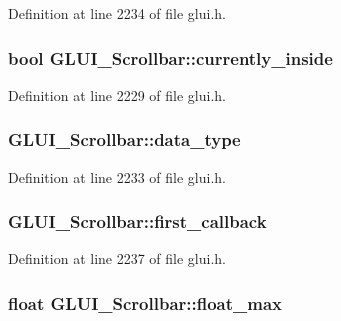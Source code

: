Definition at line 2234 of file glui.\+h.

\hypertarget{class_g_l_u_i___scrollbar_a143ab721307bb6333c74cad18ac7d07d}{
\subsubsection[{currently\+\_\+inside}]{\setlength{\rightskip}{0pt plus 5cm}bool G\+L\+U\+I\+\_\+\+Scrollbar\+::currently\+\_\+inside}}\label{class_g_l_u_i___scrollbar_a143ab721307bb6333c74cad18ac7d07d}


Definition at line 2229 of file glui.\+h.

\hypertarget{class_g_l_u_i___scrollbar_ab541530d2e7482a4bd3b35f938a5d3ae}{
\subsubsection[{data\+\_\+type}]{ G\+L\+U\+I\+\_\+\+Scrollbar\+::data\+\_\+type}}\label{class_g_l_u_i___scrollbar_ab541530d2e7482a4bd3b35f938a5d3ae}


Definition at line 2233 of file glui.\+h.

\hypertarget{class_g_l_u_i___scrollbar_afef0631b46631c19c611d2dfbdc18037}{
\subsubsection[{first\+\_\+callback}]{ G\+L\+U\+I\+\_\+\+Scrollbar\+::first\+\_\+callback}}\label{class_g_l_u_i___scrollbar_afef0631b46631c19c611d2dfbdc18037}


Definition at line 2237 of file glui.\+h.

\hypertarget{class_g_l_u_i___scrollbar_aa903ec06872ab647be22bbbf392f0061}{
\subsubsection[{float\+\_\+max}]{\setlength{\rightskip}{0pt plus 5cm}float G\+L\+U\+I\+\_\+\+Scrollbar\+::float\+\_\+max}}\label{class_g_l_u_i___scrollbar_aa903ec06872ab647be22bbbf392f0061}


